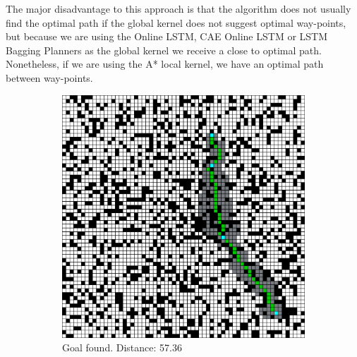 The major disadvantage to this approach is that the algorithm does not usually find the optimal path if the global kernel does not suggest optimal way-points, but because we are using the Online LSTM, CAE Online LSTM or LSTM Bagging Planners as the global kernel we receive a close to optimal path. Nonetheless, if we are using the A* local kernel, we have an optimal path between way-points.

\pagebreak

\begin{figure}[h!]
  \centerfloat
  \begin{subfigure}[b]{0.33\linewidth}
    \includegraphics[width=\linewidth]{images/way-point_nav_1.png}
     \caption{Goal found. Distance: 57.36 \newline} %
  \end{subfigure}
  \hfill
  \begin{subfigure}[b]{0.33\linewidth}

\end{subfigure}
\end{figure}
